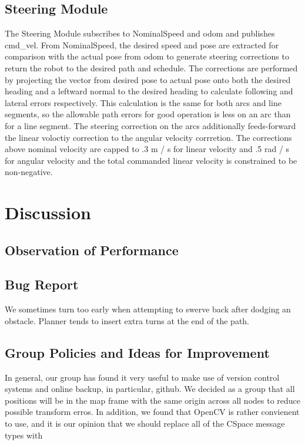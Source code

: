 \documentclass{article}
\begin{document}
\subsection{Steering Module}

The Steering Module subscribes to NominalSpeed and odom and publishes cmd_vel.
From NominalSpeed, the desired speed and pose are extracted for comparison with the actual pose from odom to generate steering corrections to return the robot to the desired path and schedule.
The corrections are performed by projecting the vector from desired pose to actual pose onto both the desired heading and a leftward normal to the desired heading to calculate following and lateral errors respectively.
This calculation is the same for both arcs and line segments, so the allowable path errors for good operation is less on an arc than for a line segment.
The steering correction on the arcs additionally feeds-forward the linear voloctiy correction to the angular velocity corrretion.
The corrections above nominal velocity are capped to .3 m / s for linear velocity and .5 rad / s for angular velocity and the total commanded linear velocity is constrained to be non-negative.

\section{Discussion}
\subsection{Observation of Performance}
\subsection{Bug Report}

We sometimes turn too early when attempting to swerve back after dodging an obstacle.
Planner tends to insert extra turns at the end of the path.

\subsection{Group Policies and Ideas for Improvement}

In general, our group has found it very useful to make use of version control systems and online backup, in particular, github.
We decided as a group that all positions will be in the map frame with the same origin across all nodes to reduce possible transform erros.
In addition, we found that OpenCV is rather convienent to use, and it is our opinion that we should replace all of the CSpace message types with 
\end{document}
